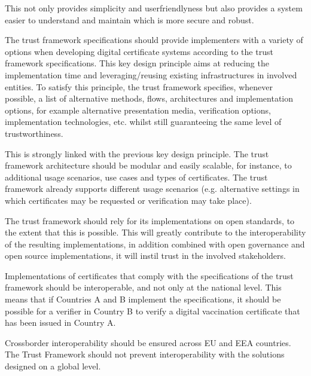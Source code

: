 \documentclass[letterpaper,10pt,english]{sphinxmanual}
\begin{document}
\begin{description}
\sphinxAtStartPar
This not only provides simplicity and user\sphinxhyphen{}friendlyness but also provides a system easier to understand and maintain which is more secure and robust.

\item[{Implementation flexibility}] \leavevmode
\sphinxAtStartPar
The trust framework specifications should provide implementers with a variety of options when developing digital certificate systems according to the trust framework specifications. This key design principle aims at reducing the implementation time and leveraging/reusing existing infrastructures in involved entities. To satisfy this principle, the trust framework specifies, whenever possible, a list of alternative methods, flows, architectures and implementation options, for example alternative presentation media, verification options, implementation technologies, etc. whilst still guaranteeing the same level of trustworthiness.

\item[{Modularity and scalability}] \leavevmode
\sphinxAtStartPar
This is strongly linked with the previous key design principle. The trust framework architecture should be modular and easily scalable, for instance, to additional usage scenarios, use cases and types of certificates. The trust framework already supports different usage scenarios (e.g. alternative settings in which certificates may be requested or verification may take place).

\item[{Open standards}] \leavevmode
\sphinxAtStartPar
The trust framework should rely for its implementations on open standards, to the extent that this is possible. This will greatly contribute to the interoperability of the resulting implementations, in addition combined with open governance and open source implementations, it will instil trust in the involved stakeholders.

\item[{Cross\sphinxhyphen{}border interoperability}] \leavevmode
\sphinxAtStartPar
Implementations of certificates that comply with the specifications of the trust framework should be interoperable, and not only at the national level. This means that if Countries A and B implement the specifications, it should be possible for a verifier in Country B to verify a digital vaccination certificate that has been issued in Country A.

\sphinxAtStartPar
Cross\sphinxhyphen{}border interoperability should be ensured across EU and EEA countries. The Trust Framework should not prevent interoperability with the solutions designed on a global level.

\end{description}
\end{document}
